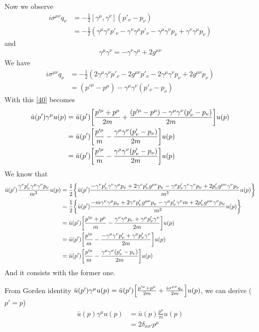 \documentclass{article}
\newcommand{\s}{\sigma}
\begin{document}
Now we observe
\begin{align*}
  i\sigma^{\mu\nu}q_{\nu}&=-\frac{1}{2}[\gamma^{\mu},\gamma^{\nu}](p'_{\nu}-p_{\nu})\\
  &=-\frac{1}{2}(\gamma^{\mu}\gamma^{\nu}p'_{\nu}-\gamma^{\nu}\gamma^{\mu}p'_{\nu}-\gamma^{\mu}\gamma^{\nu}p_{\nu}+\gamma^{\nu}\gamma^{\mu}p_{\nu})
\end{align*}
and
\begin{align*}
  \gamma^{\mu}\gamma^{\nu}=-\gamma^{\nu}\gamma^{\mu}+2g^{\mu\nu}
\end{align*}
We have
\begin{align*}
  i\sigma^{\mu\nu}q_{\nu}&=-\frac{1}{2}(2\gamma^{\mu}\gamma^{\nu}p'_{\nu}-2g^{\mu\nu}p'_{\nu}-2\gamma^{\mu}\gamma^{\nu}p_{\nu}+2g^{\mu\nu}p_{\nu})\\&=(p'^{\mu}-p^{\mu})-\gamma^{\mu}\gamma^{\nu}(p'_{\nu}-p_{\nu})
\end{align*}
With this \eqref{40} becomes
\begin{align*}
  \bar{u}(p')\gamma^{\mu}u(p)&=\bar{u}(p')\bqty{\frac{p'^{\mu}+p^{\mu}}{2m}+\frac{(p'^{\mu}-p^{\mu})-\gamma^{\mu}\gamma^{\nu}(p'_{\nu}-p_{\nu})}{2m}}u(p)\\
  &=\bar{u}(p')\bqty{\frac{p'^{\mu}}{m}-\frac{\gamma^{\mu}\gamma^{\nu}(p'_{\nu}-p_{\nu})}{2m}}u(p)\\
  &=\bar{u}(p')\bqty{\frac{p'^{\mu}}{m}-\frac{\gamma^{\mu}\gamma^{\nu}(p'_{\nu}-p_{\nu})}{2m}}u(p)
\end{align*}
We know that
\begin{align*}
  \bar{u}(p')\frac{\gamma^{\nu}p'_{\nu}\gamma^{\mu}\gamma^{\nu}p_{\nu}}{m^2}u(p)&=\frac{1}{2}\Bqty{\bar{u}(p')\frac{-\gamma^{\nu}p'_{\nu}\gamma^{\nu}\gamma^{\mu}p_{\nu}+2\gamma^{\nu}p'_{\nu}g^{\mu\nu}p_{\nu}-\gamma^{\mu}p'_{\nu}\gamma^{\nu}\gamma^{\nu}p_{\nu}+2p'_{\nu}g^{\mu\nu}\gamma^{\nu}p_{\nu}}{m^2}u(p)}\\
  &=\frac{1}{2}\Bqty{\bar{u}(p')\frac{-m\gamma^{\nu}\gamma^{\mu}p_{\nu}+2\gamma^{\nu}p'_{\nu}g^{\mu\nu}p_{\nu}-\gamma^{\mu}p'_{\nu}\gamma^{\nu}m+2p'_{\nu}g^{\mu\nu}\gamma^{\nu}p_{\nu}}{m^2}u(p)}\\
  &=\bar{u}(p')\bqty{\frac{p'^{\mu}+p^{\mu}}{m}-\frac{\gamma^{\nu}\gamma^{\mu}p_{\nu}+\gamma^{\mu}p'_{\nu}\gamma^{\nu}}{2m}}u(p)\\
  &=\bar{u}(p')\bqty{\frac{p'^{\mu}}{m}-\frac{-\gamma^{\mu}\gamma^{\nu}p'_{\nu}+\gamma^{\mu}p'_{\nu}\gamma^{\nu}}{2m}}u(p)\\
  &=\bar{u}(p')\bqty{\frac{p'^{\mu}}{m}-\frac{\gamma^{\mu}\gamma^{\nu}(p'_{\nu}-p_{\nu})}{2m}}u(p)
\end{align*}
And it consists with the former one.

From Gorden identity $\bar{u}(p')\gamma^{\mu}u(p)=\bar{u}(p')\bqty{\frac{p'^{\mu}+p^{\mu}}{2m}+\frac{i\sigma^{\mu\nu}q_{\nu}}{2m}}u(p)$, we can derive ($p'=p$)
\begin{align*}
  \bar{u}(p)\gamma^{\mu}u(p)&=\bar u(p)\frac{p^{\mu}}{m}u(p)\\
  &=2\delta_{\s\s'}p^{\mu}
\end{align*}
\end{document}
